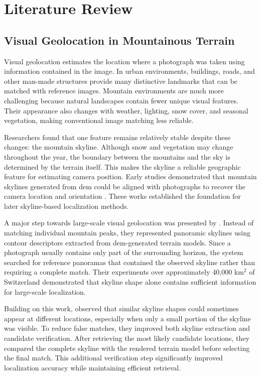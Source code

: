 \chapter{Literature Review}

\section{Visual Geolocation in Mountainous Terrain}

Visual geolocation estimates the location where a photograph was taken using information contained in the image. In urban environments, buildings, roads, and other man-made structures provide many distinctive landmarks that can be matched with reference images. Mountain environments are much more challenging because natural landscapes contain fewer unique visual features. Their appearance also changes with weather, lighting, snow cover, and seasonal vegetation, making conventional image matching less reliable.

Researchers found that one feature remains relatively stable despite these changes: the mountain skyline. Although snow and vegetation may change throughout the year, the boundary between the mountains and the sky is determined by the terrain itself. This makes the skyline a reliable geographic feature for estimating camera position. Early studies demonstrated that mountain skylines generated from \Gls{dem} could be aligned with photographs to recover the camera location and orientation \cite{naval1997,gupta2008camera}. These works established the foundation for later skyline-based localization methods.

A major step towards large-scale visual geolocation was presented by \cite{baatz2012}. Instead of matching individual mountain peaks, they represented panoramic skylines using contour descriptors extracted from \Gls{dem}-generated terrain models. Since a photograph usually contains only part of the surrounding horizon, the system searched for reference panoramas that contained the observed skyline rather than requiring a complete match. Their experiments over approximately 40,000 km$^2$ of Switzerland demonstrated that skyline shape alone contains sufficient information for large-scale localization.

Building on this work, \cite{saurer2016image} observed that similar skyline shapes could sometimes appear at different locations, especially when only a small portion of the skyline was visible. To reduce false matches, they improved both skyline extraction and candidate verification. After retrieving the most likely candidate locations, they compared the complete skyline with the rendered terrain model before selecting the final match. This additional verification step significantly improved localization accuracy while maintaining efficient retrieval.

